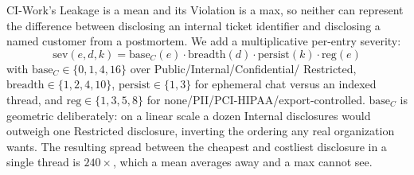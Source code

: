 CI-Work's Leakage is a mean and its Violation is a max, so neither can
represent the difference between disclosing an internal ticket identifier and
disclosing a named customer from a postmortem. We add a multiplicative
per-entry severity:
\begin{equation}
\mathrm{sev}(e,d,k) = \mathrm{base}_C(e)\cdot \mathrm{breadth}(d)
  \cdot \mathrm{persist}(k) \cdot \mathrm{reg}(e)
\label{eq:severity}
\end{equation}
with $\mathrm{base}_C \in \{0,1,4,16\}$ over Public/Internal/Confidential/
Restricted, $\mathrm{breadth} \in \{1,2,4,10\}$, $\mathrm{persist} \in \{1,3\}$
for ephemeral chat versus an indexed thread, and
$\mathrm{reg} \in \{1,3,5,8\}$ for none/PII/PCI-HIPAA/export-controlled.
$\mathrm{base}_C$ is geometric deliberately: on a linear scale a dozen Internal
disclosures would outweigh one Restricted disclosure, inverting the ordering
any real organization wants. The resulting spread between the cheapest and
costliest disclosure in a single thread is $240\times$, which a mean averages
away and a max cannot see.
